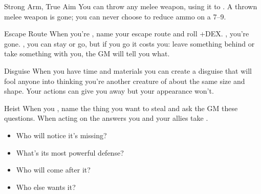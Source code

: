 \documentclass[8pt]{extarticle}
\begin{document}
\begin{multicols}{2}
\begin{amove}{Strong Arm, True Aim}
  You can throw any melee weapon, using it to . A thrown
  melee weapon is gone; you can never choose to reduce ammo on a 7–9.
\end{amove}

\begin{amove}{Escape Route}
  When you’re , name your
  escape route and roll +DEX. \onSuccess, you’re gone. \onPartial, you
  can stay or go, but if you go it costs you: leave something behind
  or take something with you, the GM will tell you what.
\end{amove}

\begin{amove}{Disguise}
  When you have time and materials you can create a disguise that will
  fool anyone into thinking you’re another creature of about the same
  size and shape. Your actions can give you away but your appearance
  won’t.
\end{amove}

\begin{amove}{Heist}
  When you ,
  name the thing you want to steal and ask the GM these
  questions. When acting on the answers you and your allies take
  .

  \begin{itemize}
  \item Who will notice it’s missing?
  \item What’s its most powerful defense?
  \item Who will come after it?
  \item Who else wants it?
  \end{itemize}
\end{amove}

\vfill\null
\end{multicols}
\end{document}
